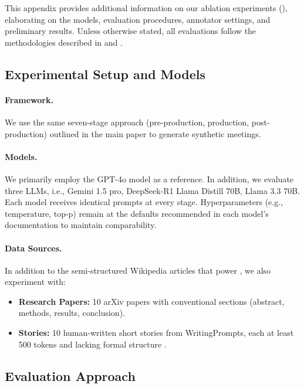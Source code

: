 \label{sec:appendix_H}

This appendix provides additional information on our ablation experiments (), elaborating on the models, evaluation procedures, annotator settings, and preliminary results. Unless otherwise stated, all evaluations follow the methodologies described in  and .

\subsection{Experimental Setup and Models}

\paragraph{Framework.}
We use the same seven-stage \pipeline{} approach (pre-production, production, post-production) outlined in the main paper to generate synthetic meetings.

\paragraph{Models.}
We primarily employ the GPT-4o model as a reference. In addition, we evaluate three LLMs, i.e., Gemini 1.5 pro, DeepSeek-R1 Llama Distill 70B, Llama 3.3 70B.
Each model receives identical prompts at every \pipeline{} stage. Hyperparameters (e.g., temperature, top-p) remain at the defaults recommended in each model’s documentation to maintain comparability.

\paragraph{Data Sources.}
In addition to the semi-structured Wikipedia articles that power \dataset{}, we also experiment with:
\begin{itemize}[leftmargin=1em]
    \item \textbf{Research Papers:} 10 arXiv papers \cite{CohanDKB18} with conventional sections (abstract, methods, results, conclusion).  
    \item \textbf{Stories:} 10 human-written short stories from WritingPrompts, each at least 500 tokens and lacking formal structure \cite{FanLD18a}.
\end{itemize}

\subsection{Evaluation Approach}

